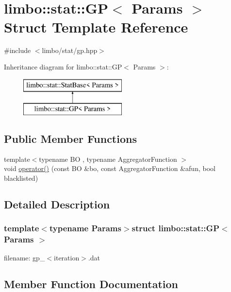 \hypertarget{structlimbo_1_1stat_1_1_g_p}{}\section{limbo\+:\+:stat\+:\+:G\+P$<$ Params $>$ Struct Template Reference}
\label{structlimbo_1_1stat_1_1_g_p}


{\ttfamily \#include $<$limbo/stat/gp.\+hpp$>$}

Inheritance diagram for limbo\+:\+:stat\+:\+:G\+P$<$ Params $>$\+:\begin{figure}[H]
\begin{center}
\leavevmode
\includegraphics[height=2.000000cm]{structlimbo_1_1stat_1_1_g_p}
\end{center}
\end{figure}
\subsection*{Public Member Functions}
\begin{DoxyCompactItemize}
\item 
{\footnotesize template$<$typename B\+O , typename Aggregator\+Function $>$ }\\void \hyperlink{structlimbo_1_1stat_1_1_g_p_ae4963dbd20077223711a646226091944}{operator()} (const B\+O \&bo, const Aggregator\+Function \&afun, bool blacklisted)
\end{DoxyCompactItemize}


\subsection{Detailed Description}
\subsubsection*{template$<$typename Params$>$struct limbo\+::stat\+::\+G\+P$<$ Params $>$}

filename\+: {\ttfamily gp\+\_\+$<$iteration$>$.dat} 

\subsection{Member Function Documentation}
\hypertarget{structlimbo_1_1stat_1_1_g_p_ae4963dbd20077223711a646226091944}{}
